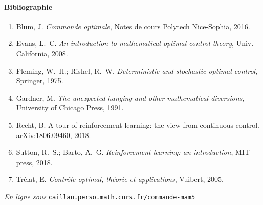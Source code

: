 \documentclass[11pt,a4paper]{article}
\theoremstyle{plain}
\theoremstyle{definition}
\begin{document}
\paragraph{Bibliographie}
\begin{enumerate}
\item Blum, J.
\emph{Commande optimale}, Notes de cours Polytech Nice-Sophia, 2016.
\item Evans, L.~C.
\emph{An introduction to mathematical optimal control theory}, Univ. California, 2008.
\item Fleming, W.~H.; Rishel, R.~W.
\emph{Deterministic and stochastic optimal control}, Springer, 1975.
\item Gardner, M.
\emph{The unexpected hanging and other mathematical diversions},
University of Chicago Press, 1991.
\item Recht, B.
A tour of reinforcement learning: the view from continuous control.
arXiv:1806.09460, 2018.
\item Sutton, R.~S.; Barto, A.~G.
\emph{Reinforcement learning: an introduction}, MIT press, 2018.
\item Tr\'elat, E.
\emph{Contr\^ole optimal, th\'eorie et applications}, Vuibert, 2005.

\end{enumerate}

\vfill \begin{flushright}{\footnotesize \emph{En ligne sous}
\texttt{caillau.perso.math.cnrs.fr/commande-mam5}} \end{flushright}
\end{document}
